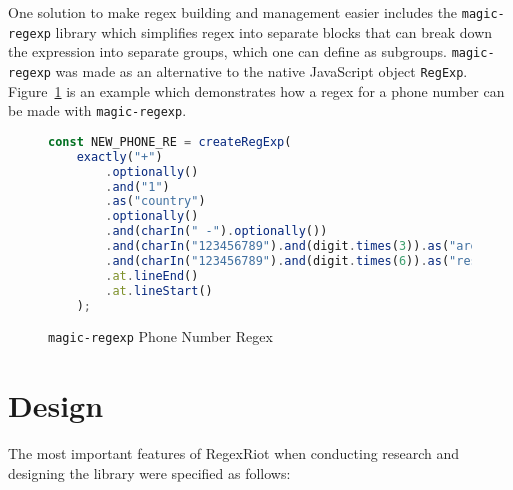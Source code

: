 \documentclass[conference]{IEEEtran}
\begin{document}
One solution to make regex building and management easier includes the \texttt{magic-regexp} library
which simplifies regex into separate blocks that can break down the expression into separate
groups, which one can define as subgroups.\cite{magic-regexp}
\texttt{magic-regexp} was made as an alternative to the native JavaScript object \texttt{RegExp}.
Figure~\ref{fig:magic-regexp-phonenum-regex} is an example which demonstrates how a regex for a phone number can be made with
\texttt{magic-regexp}. \cite{omereshone2023}

\vfill\eject

\begin{figure}[htbp]
    \centering
    \label{fig:magic-regexp-phonenum-regex}
    \begin{lstlisting}[language=JavaScript]
const NEW_PHONE_RE = createRegExp(
    exactly("+")
        .optionally()
        .and("1")
        .as("country")
        .optionally()
        .and(charIn(" -").optionally())
        .and(charIn("123456789").and(digit.times(3)).as("area"))
        .and(charIn("123456789").and(digit.times(6)).as("rest"))
        .at.lineEnd()
        .at.lineStart()
    );
    \end{lstlisting}
    \caption{\texttt{magic-regexp} Phone Number Regex}
\end{figure}

\section{Design}

The most important features of RegexRiot when conducting research and
designing the library were specified as follows:
\end{document}
